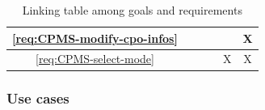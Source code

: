 \begin{table}[h]
\begin{center}
\begin{tabular}{|c||c|c|c|c|c|}
            \ref{req:CPMS-modify-cpo-infos}       &                                 &                                &                              &                                & X                              \\\hline
            \ref{req:CPMS-select-mode}            &                                 &                                &                              & X                              & X                              \\\hline
        \end{tabular}
    \end{center}
    \caption{Linking table among goals and requirements}
\end{table}

\clearpage
\subsubsection{Use cases}


